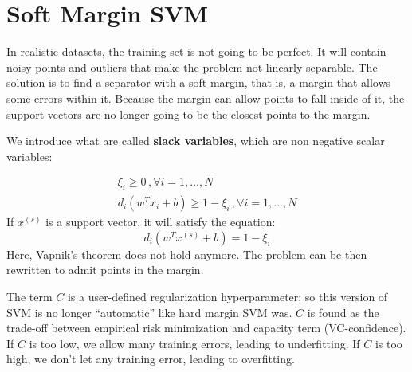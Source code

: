 \section{Soft Margin SVM}

In realistic datasets, the training set is not going to be perfect. It will contain noisy points and outliers that make the problem not linearly separable. The solution is to find a separator with a soft margin, that is, a margin that allows some errors within it. Because the margin can allow points to fall inside of it, the support vectors are no longer going to be the closest points to the margin.

We introduce what are called \textbf{slack variables}, which are non negative scalar variables:

\begin{gather*}
    \xi_i \geq 0 \, , \forall i = 1, \dots , N \\
    d_i(w^T x_i + b) \geq 1 - \xi_i \, , \forall i = 1, \dots , N
\end{gather*}
If $x^{(s)}$ is a support vector, it will satisfy the equation:
\begin{equation*}
    d_i(w^T x^{(s)} + b) = 1 - \xi_i 
\end{equation*}
Here, Vapnik's theorem does not hold anymore. The problem can be then rewritten to admit points in the margin.

The term $C$ is a user-defined regularization hyperparameter; so this version of SVM is no longer ``automatic'' like hard margin SVM was. $C$ is found as the trade-off between empirical risk minimization and capacity term (VC-confidence). If $C$ is too low, we allow many training errors, leading to underfitting. If $C$ is too high, we don't let any training error, leading to overfitting.

